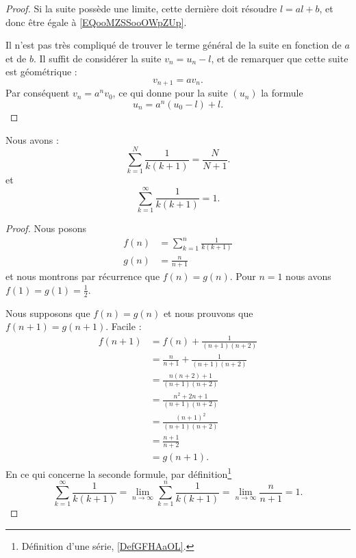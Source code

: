 \begin{proof}
    Si la suite possède une limite, cette dernière doit résoudre \( l=al+b\), et donc être égale à \eqref{EQooMZSSooOWpZUp}.

	Il n'est pas très compliqué de trouver le terme général de la suite en fonction de \( a\) et de \( b\). Il suffit de considérer la suite \( v_n=u_n-l\), et de remarquer que cette suite est géométrique :
	\begin{equation}
		v_{n+1}=av_n.
	\end{equation}
	Par conséquent \( v_n=a^nv_0\), ce qui donne pour la suite \( (u_n)\) la formule
	\begin{equation}
		u_n=a^n(u_0-l)+l.
	\end{equation}
\end{proof}

\begin{lemma}     \label{LEMooKDHPooPlFTIT}
	Nous avons :
	\begin{equation}
		\sum_{k=1}^N\frac{1}{ k(k+1) }=\frac{ N }{ N+1 }.
	\end{equation}
	et
	\begin{equation}
		\sum_{k=1}^{\infty}\frac{1}{ k(k+1) }=1.
	\end{equation}
\end{lemma}

\begin{proof}
	Nous posons
	\begin{subequations}
		\begin{align}
			f(n) & =\sum_{k=1}^n\frac{1}{ k(k+1) } \\
			g(n) & =\frac{ n }{ n+1 }
		\end{align}
	\end{subequations}
	et nous montrons par récurrence que \( f(n)=g(n)\). Pour \( n=1\) nous avons \( f(1)=g(1)=\frac{ 1 }{2}\).

	Nous supposons que \( f(n)=g(n)\) et nous prouvons que \( f(n+1)=g(n+1)\). Facile :
	\begin{subequations}
		\begin{align}
			f(n+1) & =f(n)+\frac{1}{ (n+1)(n+2) }              \\
			       & =\frac{ n }{ n+1 }+\frac{1}{ (n+1)(n+2) } \\
			       & =\frac{ n(n+2)+1 }{ (n+1)(n+2) }          \\
			       & =\frac{ n^2+2n+1 }{ (n+1)(n+2) }          \\
			       & =\frac{ (n+1)^2 }{ (n+1)(n+2) }           \\
			       & =\frac{ n+1 }{ n+2 }                      \\
			       & =g(n+1).
		\end{align}
	\end{subequations}
	En ce qui concerne la seconde formule, par définition\footnote{Définition d'une série, \ref{DefGFHAaOL}.}
	\begin{equation}
		\sum_{k=1}^{\infty}\frac{1}{ k(k+1) }=\lim_{n\to \infty} \sum_{k=1}^n\frac{1}{ k(k+1) }=\lim_{n\to \infty}\frac{ n }{ n+1 } =1.
	\end{equation}
\end{proof}

